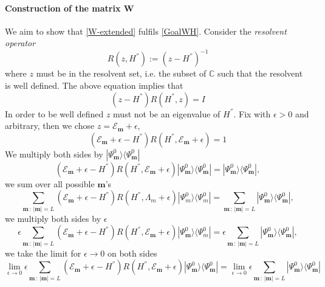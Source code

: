 \documentclass[10pt]{article}
\numberwithin{equation}{section}
\numberwithin{equation}{subsection}
\begin{document}
\paragraph{Construction of the matrix W}
We aim to show that \eqref{W-extended} fulfils \eqref{GoalWH}. Consider the \textit{resolvent operator}
\begin{equation}
	R(z,H^{''}):=\left(z-H^{''}\right)^{-1}
\end{equation}
where $z$ must be in the resolvent set, i.e. the subset of $\mathbb{C}$ such that the resolvent is well defined. 
The above equation implies that 
\begin{equation}
	(z-H^{''})R(H^{''},z)=I
\end{equation}
In order to be well defined $z$ must not be an eigenvalue of $H^{''}$. Fix with $\epsilon>0$ and arbitrary, then we chose $z=\mathcal{E}_{\bm{m}}+\epsilon$, 
\begin{equation}
	(\mathcal{E}_{\bm{m}}+\epsilon-H^{''})R(H^{''},\mathcal{E}_{\bm{m}}+\epsilon)=1
\end{equation}
We multiply both sides by $|\Psi_{\bm{m}}^{0}\rangle \langle \Psi_{\bm{m}}^{0}|$
\begin{equation}
	(\mathcal{E}_{\bm{m}}+\epsilon-H^{''})R(H^{''},\mathcal{E}_{\bm{m}}+\epsilon)|\Psi_{\bm{m}}^{0}\rangle \langle \Psi_{\bm{m}}^{0}|=|\Psi_{\bm{m}}^{0}\rangle \langle \Psi_{\bm{m}}^{0}|,
\end{equation}
we sum over all possible $\bm{m}$'s 
\begin{equation}
	\sum_{\bm{m}\,:\, |\bm{m}|=L}  (\mathcal{E}_{\bm{m}}+\epsilon-H^{''})R(H^{''},\Lambda_{m}+\epsilon)|\Psi_{m}^{0}\rangle \langle \Psi_{m}^{0}|=\sum_{\bm{m}\,:\, |\bm{m}|=L}|\Psi_{\bm{m}}^{0}\rangle \langle \Psi_{\bm{m}}^{0}|,
\end{equation}
we multiply both sides by $\epsilon$ 
\begin{equation}
	\epsilon\sum_{\bm{m}\,:\, |\bm{m}|=L}  (\mathcal{E}_{\bm{m}}+\epsilon-H^{''})R(H^{''},\mathcal{E}_{\bm{m}}+\epsilon)|\Psi_{\bm{m}}^{0}\rangle \langle \Psi_{m}^{0}|=\epsilon\sum_{\bm{m}\,:\, |\bm{m}|=L}|\Psi_{\bm{m}}^{0}\rangle \langle \Psi_{\bm{m}}^{0}|,
\end{equation}
we take the limit for $\epsilon\to 0$ on both sides 
\begin{equation}
	\lim_{\epsilon\to 0}\epsilon\sum_{\bm{m}\,:\, |\bm{m}|=L} (\mathcal{E}_{\bm{m}}+\epsilon-H^{''})R(H^{''},\mathcal{E}_{\bm{m}}+\epsilon)|\Psi_{\bm{m}}^{0}\rangle \langle \Psi_{\bm{m}}^{0}|=\lim_{\epsilon\to 0}\epsilon\sum_{\bm{m}\,:\,|\bm{m}|=L}|\Psi_{\bm{m}}^{0}\rangle \langle \Psi_{\bm{m}}^{0}|
\end{equation}
\end{document}
